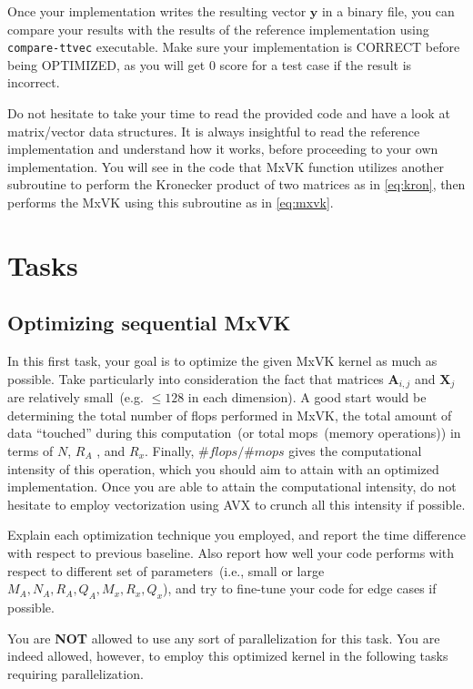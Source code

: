 \documentclass{article}
\newcommand{\mat}[1]{\mathbf{#1}}
\renewcommand{\vec}[1]{\mathbf{#1}}
\begin{document}
Once your implementation writes the resulting vector $\vec{y}$ in a binary file, you can compare your results with the results of the reference implementation using \texttt{compare-ttvec} executable.
Make sure your implementation is CORRECT before being OPTIMIZED, as you will get 0 score for a test case if the result is incorrect.

Do not hesitate to take your time to read the provided code and have a look at matrix/vector data structures.
It is always insightful to read the reference implementation and understand how it works, before proceeding to your own implementation.
You will see in the code that MxVK function utilizes another subroutine to perform the Kronecker product of two matrices as in \eqref{eq:kron}, then performs the MxVK using this subroutine as in \eqref{eq:mxvk}.

\section{Tasks}

\subsection{Optimizing sequential MxVK}
In this first task, your goal is to optimize the given MxVK kernel as much as possible.
Take particularly into consideration the fact that matrices $\mat{A}_{i, j}$ and $\vec{X}_{j}$ are relatively small~(e.g. $\le 128$ in each dimension).
A good start would be determining the total number of flops performed in MxVK, the total amount of data ``touched'' during this computation~(or total mops~(memory operations)) in terms of $N$, $R_A$ , and $R_x$.
Finally, $\#flops / \#mops$ gives the computational intensity of this operation, which you should aim to attain with an optimized implementation.
Once you are able to attain the computational intensity, do not hesitate to employ vectorization using AVX to crunch all this intensity if possible.

Explain each optimization technique you employed, and report the time difference with respect to previous baseline.
Also report how well your code performs with respect to different set of parameters~(i.e., small or large $M_A, N_A, R_A, Q_A, M_x, R_x, Q_x$), and try to fine-tune your code for edge cases if possible.

You are \textbf{NOT} allowed to use any sort of parallelization for this task. You are indeed allowed, however, to employ this optimized kernel in the following tasks requiring parallelization.
\end{document}
